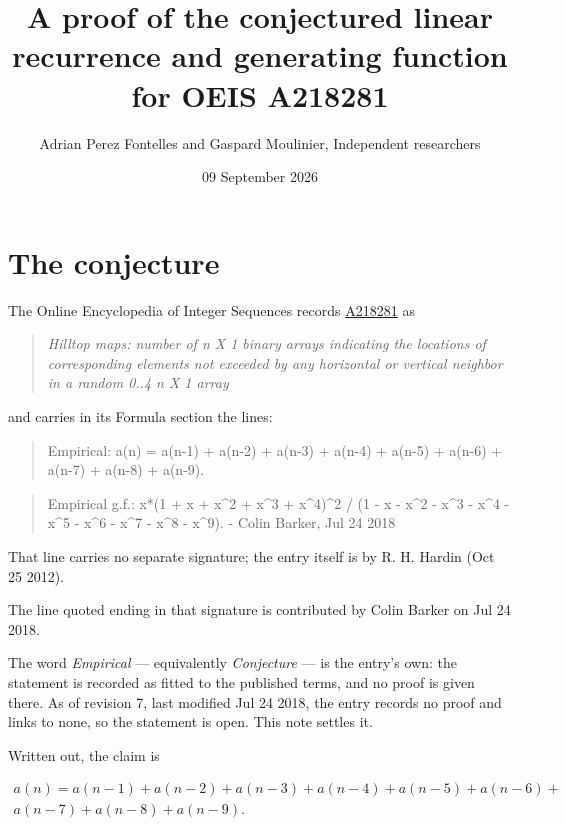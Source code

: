 \documentclass[11pt]{article}
\title{A proof of the conjectured linear recurrence and generating function for OEIS A218281}
\author{Adrian Perez Fontelles and Gaspard Moulinier, Independent researchers}
\date{09 September 2026}
\theoremstyle{definition}
\begin{document}
\maketitle
\section{The conjecture}

The Online Encyclopedia of Integer Sequences records \href{https://oeis.org/A218281}{A218281} as

\begin{quote}\itshape Hilltop maps: number of n X 1 binary arrays indicating the locations of corresponding elements not exceeded by any horizontal or vertical neighbor in a random 0..4 n X 1 array\end{quote}

and carries in its Formula section the lines:

\begin{quote}\ttfamily Empirical: a(n) = a(n-1) + a(n-2) + a(n-3) + a(n-4) + a(n-5) + a(n-6) + a(n-7) + a(n-8) + a(n-9).\end{quote}

\begin{quote}\ttfamily Empirical g.f.: x*(1 + x + x\textasciicircum{}2 + x\textasciicircum{}3 + x\textasciicircum{}4)\textasciicircum{}2 / (1 - x - x\textasciicircum{}2 - x\textasciicircum{}3 - x\textasciicircum{}4 - x\textasciicircum{}5 - x\textasciicircum{}6 - x\textasciicircum{}7 - x\textasciicircum{}8 - x\textasciicircum{}9). - Colin Barker, Jul 24 2018\end{quote}

That line carries no separate signature; the entry itself is by R. H. Hardin (Oct 25 2012).

The line quoted ending in that signature is contributed by Colin Barker on Jul 24 2018.

The word {\itshape Empirical} --- equivalently {\itshape Conjecture} --- is the entry's own: the statement is recorded as fitted to the published terms, and no proof is given there. As of revision 7, last modified Jul 24 2018, the entry records no proof and links to none, so the statement is open. This note settles it.

Written out, the claim is

\begin{multline*} a(n) = a(n-1) + a(n-2) + a(n-3) + a(n-4) + a(n-5) + a(n-6) + \\ a(n-7) + a(n-8) + a(n-9). \end{multline*}
\end{document}
